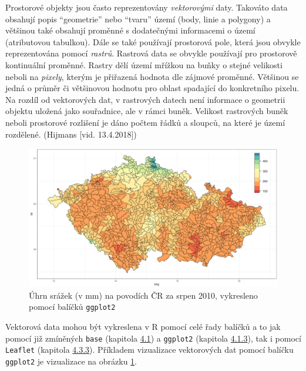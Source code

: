 \documentclass[12pt,]{article}
\begin{document}
\qquad Prostorové objekty jsou často reprezentovány \emph{vektorovými}
daty. Takováto data obsahují popis \enquote{geometrie} nebo
\enquote{tvaru} území (body, linie a polygony) a většinou také obsahují
proměnné s dodatečnými informacemi o území (atributovou tabulkou). Dále
se také používají prostorová pole, která jsou obvykle reprezentována
pomocí \emph{rastrů}. Rastrová data se obvykle používají pro prostorově
kontinuální proměnné. Rastry dělí území mřížkou na buňky o stejné
velikosti neboli na \emph{pixely}, kterým je přiřazená hodnota dle
zájmové proměnné. Většinou se jedná o průměr či většinovou hodnotu pro
oblast spadající do konkretního pixelu. Na rozdíl od vektorových dat, v
rastrových datech není informace o geometrii objektu uložená jako
souřadnice, ale v rámci buněk. Velikost rastrových buněk neboli
prostorové rozlišení je dáno počtem řádků a sloupců, na které je území
rozdělené. (Hijmans {[}vid. 13.4.2018{]})

\begin{figure}[H]
  \centering
      \includegraphics[width=\textwidth]{fig/ggplot_map2}
      \caption{Úhrn srážek (v mm) na povodích ČR za srpen 2010, vykresleno pomocí balíčků \texttt{ggplot2}}
      \label{fig:ch4.2}
\end{figure}

\qquad Vektorová data mohou být vykreslena v R pomocí celé řady balíčků
a to jak pomocí již zmíněných \texttt{base} (kapitola
\protect\hyperlink{baseviz}{4.1}) a \texttt{ggplot2} (kapitola
\protect\hyperlink{ggplot}{4.1.3}), tak i pomocí \texttt{Leaflet}
(kapitola \protect\hyperlink{leaflet}{4.3.3}). Příkladem vizualizace
vektorových dat pomocí balíčku \texttt{ggplot2} je vizualizace na
obrázku \ref{fig:ch4.2}.
\end{document}
